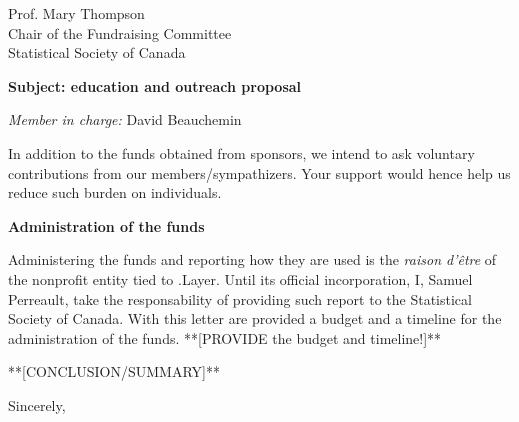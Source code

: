 \documentclass[11pt, a4paper]{letter} %
\begin{document}
\begin{letter}{
	Prof. Mary Thompson\\
	Chair of the Fundraising Committee\\
	Statistical Society of Canada
	
	\bigskip
	\textbf{Subject: education and outreach proposal}%
}
\begin{enumerate}
	\bigskip
	\emph{Member in charge:} David Beauchemin
\end{enumerate}

In addition to the funds obtained from sponsors, we intend to ask voluntary contributions from our members/sympathizers. Your support would hence help us reduce such burden on individuals.


\bigskip
\noindent \textbf{Administration of the funds}

Administering the funds and reporting how they are used is the \emph{raison d'\^{e}tre} of the nonprofit entity tied to .Layer. Until its official incorporation, I, Samuel Perreault, take the responsability of providing such report to the Statistical Society of Canada. With this letter are provided a budget and a timeline for the administration of the funds. **[PROVIDE the budget and timeline!]**

\bigskip

**[CONCLUSION/SUMMARY]**

%
      
\closing{Sincerely,}




\end{letter}
\end{document}

